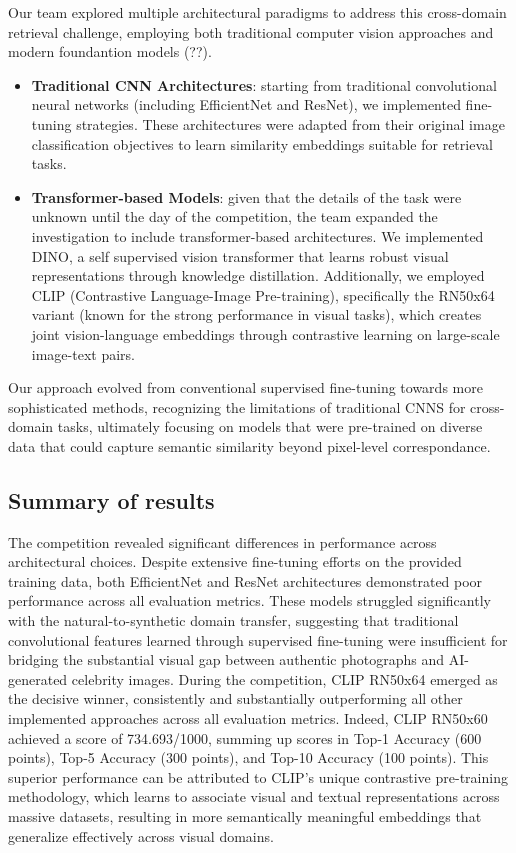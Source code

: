 Our team explored multiple architectural paradigms to address this cross-domain retrieval challenge, employing both traditional computer vision approaches and modern foundantion models (??).
\begin{itemize}
\item {\bf Traditional CNN Architectures}: starting from traditional convolutional neural networks (including EfficientNet and ResNet), we implemented fine-tuning strategies.
These architectures were adapted from their original image classification objectives to learn similarity embeddings suitable for retrieval tasks. 
\item {\bf Transformer-based Models}: given that the details of the task were unknown until the day of the competition, the team expanded the investigation to include transformer-based architectures. 
We implemented DINO, a self supervised vision transformer that learns robust visual representations through knowledge distillation. 
Additionally, we employed CLIP (Contrastive Language-Image Pre-training), specifically the RN50x64 variant (known for the strong performance in visual tasks), which creates joint vision-language embeddings through contrastive learning on large-scale image-text pairs. 
\end{itemize}
Our approach evolved from conventional supervised fine-tuning towards more sophisticated methods, recognizing the limitations of traditional CNNS for cross-domain tasks, ultimately focusing on models that were pre-trained on diverse data that could capture semantic similarity beyond pixel-level correspondance. 

\subsection{Summary of results }
The competition revealed significant differences in performance across architectural choices. 
Despite extensive fine-tuning efforts on the provided training data, both EfficientNet and ResNet architectures demonstrated poor performance across all evaluation metrics. 
These models struggled significantly with the natural-to-synthetic domain transfer, suggesting that traditional convolutional features learned through supervised fine-tuning were insufficient for bridging the substantial visual gap between authentic photographs and AI-generated celebrity images.
During the competition, CLIP RN50x64 emerged as the decisive winner, consistently and substantially outperforming all other implemented approaches across all evaluation metrics. 
Indeed, CLIP RN50x60 achieved a score of 734.693/1000, summing up scores in Top-1 Accuracy (600 points), Top-5 Accuracy (300 points), and Top-10 Accuracy (100 points).
This superior performance can be attributed to CLIP's unique contrastive pre-training methodology, which learns to associate visual and textual representations across massive datasets, resulting in more semantically meaningful embeddings that generalize effectively across visual domains.


